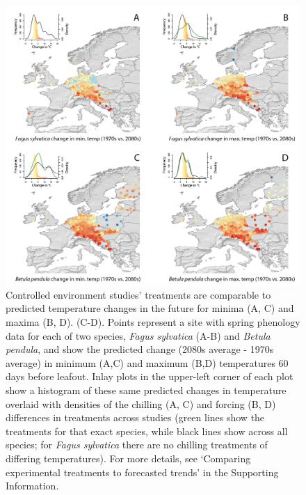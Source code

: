 \documentclass[11pt,letter]{article}
\begin{document}
\begin{figure}[t!]
\centering
\includegraphics[width=1\textwidth]{figures/Fig7_noblues_densities.png}
\caption{Controlled environment studies' treatments are comparable to predicted temperature changes in the future for minima (A, C) and maxima (B, D). (C-D). Points represent a site with spring phenology data for each of two species, \emph{Fagus sylvatica} (A-B) and \emph{Betula pendula}, \citep[from the PEP725 database,][]{Templ2018} and show the predicted change (2080s average - 1970s average) in minimum (A,C) and maximum (B,D) temperatures 60 days before leafout. Inlay plots in the upper-left  corner of each plot show a histogram of these same predicted changes in temperature overlaid with densities of the chilling (A, C) and forcing (B, D) differences in treatments across studies (green lines show the treatments for that exact species, while black lines show across all species; for \emph{Fagus sylvatica} there are no chilling treatments of differing temperatures). For more details, see `Comparing experimental treatments to forecasted trends' in the Supporting Information.}
  \label{fig:pep} %
\end{figure}
\end{document}
